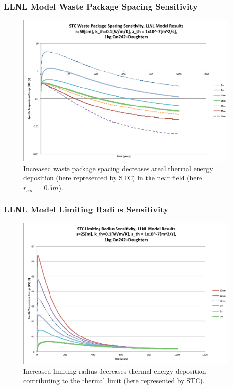 

\begin{frame}[ctb!]
\frametitle{LLNL Model Waste Package Spacing Sensitivity}

\begin{figure}[htbp!]
\begin{center}
\includegraphics[height=0.7\textheight]{./thermal_demonstration/spacing/Cm242spacing_sens.eps}
\end{center}
\caption[$K_{th}$ Sensitivity to $s$]{Increased waste package 
spacing decreases areal thermal energy deposition 
(here represented by STC) in the near field (here $r_{calc} = 0.5m$).}
\label{fig:Cm242spacing_sens}
\end{figure}
\end{frame}


\begin{frame}[ctb!]
\frametitle{LLNL Model Limiting Radius Sensitivity}
\begin{figure}[htbp!]
\begin{center}
\includegraphics[height=0.7\textheight]{./thermal_demonstration/spacing/Cm242r_lim_sens.eps}
\end{center}
\caption[$K_{th}$ Sensitivity to $r_{lim}$]{Increased limiting radius 
decreases thermal energy deposition contributing to the thermal limit
(here represented by STC).}
\label{fig:Cm242r_lim_sens}
\end{figure}
\end{frame}

